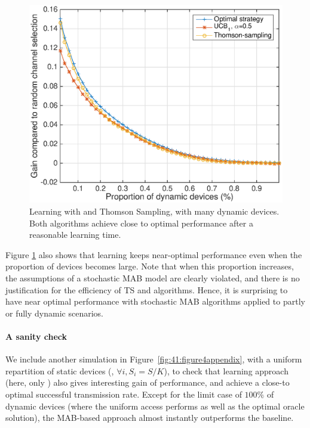 \begin{figure}[!t]
    \centering
    \includegraphics[scale=0.60]{perf_learning.eps}
    \caption{Learning with \UCB{} and Thomson Sampling, with many dynamic devices. Both algorithms achieve close to optimal performance after a reasonable learning time.}
    \label{fig:41:perf_learning}
\end{figure}

Figure \ref{fig:41:perf_learning} also shows that learning keeps near-optimal performance even when the proportion of devices becomes large.
Note that when this proportion increases, the assumptions of a stochastic MAB model are clearly violated, and there is no justification for the efficiency of TS and \UCB{} algorithms.
Hence, it is surprising to have near optimal performance with stochastic MAB algorithms applied to partly or fully dynamic scenarios.


\paragraph{A sanity check}

We include another simulation in Figure~\ref{fig:41:figure4appendix}, with a uniform repartition of static devices (\ie, $\forall i, S_i = S/K$), to check that learning approach (here, only \UCB)
also gives interesting gain of performance, and achieve a close-to optimal successful transmission rate.
Except for the limit case of $100\%$ of dynamic devices (where the uniform access performs as well as the optimal oracle solution), the MAB-based approach almost instantly outperforms the baseline.

